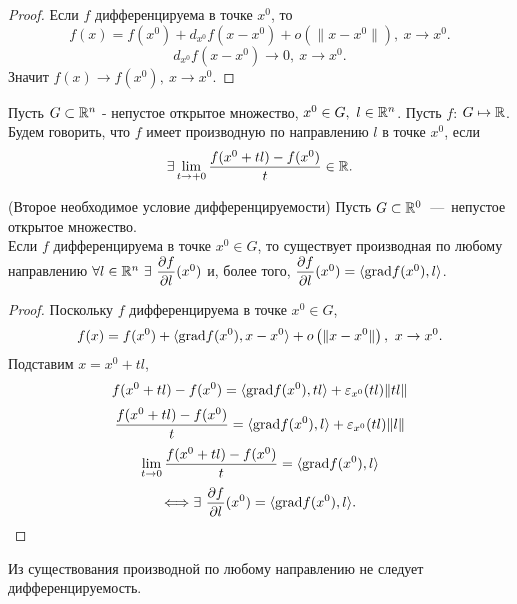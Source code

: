 \begin{proof}
    Если $f$ дифференцируема в точке $x^0$, то 
    $$f(x) = f(x^0) + d_{x^0}f(x-x^0) + o\left(\|x - x^0\|\right), \ x \to x^{0}.$$
    $$d_{x^0}f(x-x^0) \to 0, \ x \to x^{0}.$$
    Значит $f(x) \to f(x^0), \ x \to x^{0}.$
\end{proof}

\begin{definition}
        Пусть $G \subset \mathbb{R}^n$ - непустое открытое множество, $x^0 \in G, \ l \in \mathbb{R}^n$. Пусть $f$: $G \mapsto \mathbb{R}$. Будем говорить, что $f$ имеет производную по направлению $l$ в точке $x^0$, если $$\exists \lim_{t \to +0} \dfrac{f (x^0 + tl) - f(x^0)}{t} \in \mathbb{R} .$$
\end{definition}

\begin{theorem}
    (Второе необходимое условие дифференцируемости) Пусть $G \subset \mathbb{R}^0 $~---~непустое открытое множество. \\
    Если $f$ дифференцируема в точке $x^0 \in G$, то существует производная по любому направлению $\forall l \in \mathbb{R}^n \ \exists \ \dfrac{\partial f}{\partial l} (x^0)$ и, более того, $\dfrac{\partial f}{\partial l} (x^0) = \langle \textup{grad} f(x^0), l \rangle$.
\end{theorem}

\begin{proof}
    Поскольку $f$ дифференцируема в точке $x^0 \in G$,
    $$f(x) = f(x^0) + \langle \textup{grad} f(x^0), x - x^0 \rangle + o\left(\|x - x^0\|\right), \ x \to x^{0}.$$
    Подставим $x = x^0 + tl$,
    $$ f(x^0 + tl) - f(x^0) = \langle \textup{grad} f(x^0), tl \rangle + \varepsilon_{x^0}(tl) \|tl\|$$
    $$\dfrac{f (x^0 + tl) - f(x^0)}{t} = \langle \textup{grad} f(x^0), l \rangle + \varepsilon_{x^0}(tl) \|l\| $$
    $$\lim\limits_{t \to 0} \dfrac{f (x^0 + tl) - f(x^0)}{t} = \langle \textup{grad} f(x^0), l \rangle$$
    $$\Longleftrightarrow \exists \ \dfrac{\partial f}{\partial l} (x^0) = \langle \textup{grad} f(x^0), l \rangle .$$
\end{proof}

\begin{note}
    Из существования производной по любому направлению не следует дифференцируемость.
\end{note}

